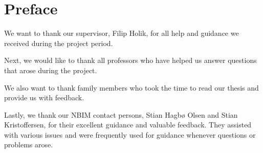 \chapter*{Preface}

We want to thank our supervisor, Filip Holik, for all help and guidance we received during the project period. 

Next, we would like to thank all professors who have helped us answer questions that arose during the project. 

We also want to thank family members who took the time to read our thesis and provide us with feedback.

Lastly, we thank our NBIM contact persons, Stian Hagbø Olsen and Stian Kristoffersen, for their excellent guidance and valuable feedback. They assisted with various issues and were frequently used for guidance whenever questions or problems arose.

\newpage